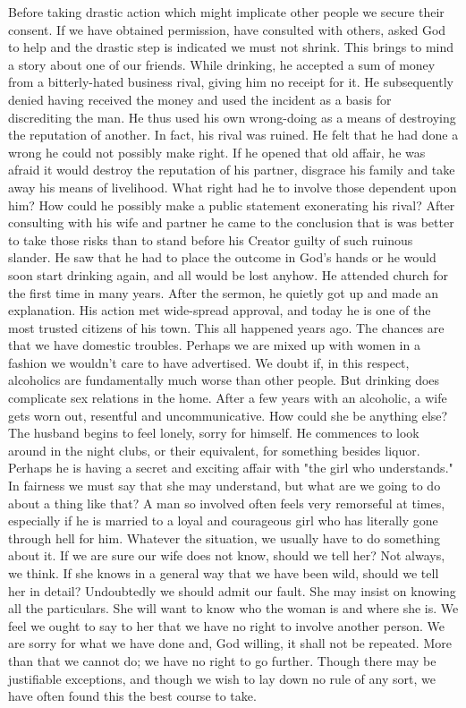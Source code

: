 \begin{biblechapter}
Before taking drastic action which might implicate other people we secure their consent.  If we have obtained permission, have consulted with others, asked God to help and the drastic step is indicated we must not shrink.
This brings to mind a story about one of our friends.  While drinking, he accepted a sum of money from a bitterly-hated business rival, giving him no receipt for it.  He subsequently denied having received the money and used the incident as a basis for discrediting the man.  He thus used his own wrong-doing as a means of destroying the reputation of another.  In fact, his rival was ruined.
He felt that he had done a wrong he could not possibly make right.  If he opened that old affair, he was afraid it would destroy the reputation of his partner, disgrace his family and take away his means of livelihood.  What right had he to involve those dependent upon him?  How could he possibly make a public statement exonerating his rival?
After consulting with his wife and partner he came to the conclusion that is was better to take those risks than to stand before his Creator guilty of such ruinous slander.  He saw that he had to place the outcome in God's hands or he would soon start drinking again, and all would be lost anyhow.  He attended church for the first time in many years.  After the sermon, he quietly got up and made an explanation.  His action met wide-spread approval, and today he is one of the most trusted citizens of his town.  This all happened years ago.
The chances are that we have domestic troubles.  Perhaps we are mixed up with women in a fashion we wouldn't care to have advertised.  We doubt if, in this respect, alcoholics are fundamentally much worse than other people.  But drinking does complicate sex relations in the home.  After a few years with an alcoholic, a wife gets worn out, resentful and uncommunicative.  How could she be anything else?  The husband begins to feel lonely, sorry for himself.  He commences to look around in the night clubs, or their equivalent, for something besides liquor.  Perhaps he is having a secret and exciting affair with "the girl who understands."  In fairness we must say that she may understand, but what are we going to do about a thing like that?  A man so involved often feels very remorseful at times, especially if he is married to a loyal and courageous girl who has literally gone through hell for him.
Whatever the situation, we usually have to do something about it.  If we are sure our wife does not know, should we tell her?  Not always, we think.  If she knows in a general way that we have been wild, should we tell her in detail?  Undoubtedly we should admit our fault.  She may insist on knowing all the particulars.  She will want to know who the woman is and where she is.  We feel we ought to say to her that we have no right to involve another person.  We are sorry for what we have done and, God willing, it shall not be repeated.  More than that we cannot do; we have no right to go further.  Though there may be justifiable exceptions, and though we wish to lay down no rule of any sort, we have often found this the best course to take.

\end{biblechapter}
